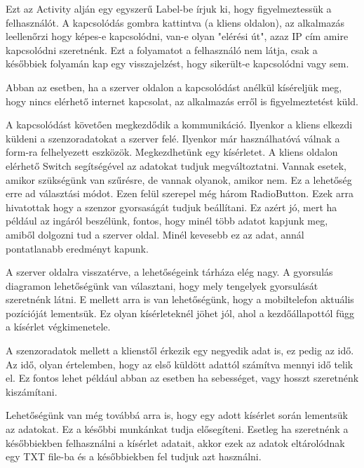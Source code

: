 \documentclass{thesis-ekf}
\theoremstyle{definition}
\theoremstyle{remark}
\begin{document}
Ezt az Activity alján egy egyszerű Label-be írjuk ki, hogy figyelmeztessük a felhasználót. A kapcsolódás gombra kattintva (a kliens oldalon), az alkalmazás leellenőrzi hogy képes-e kapcsolódni, van-e olyan "elérési út", azaz IP cím amire kapcsolódni szeretnénk. Ezt a folyamatot a felhasználó nem látja, csak a későbbiek folyamán kap egy visszajelzést, hogy sikerült-e kapcsolódni vagy sem.
\par Abban az esetben, ha a szerver oldalon a kapcsolódást anélkül kíséreljük meg, hogy nincs elérhető internet kapcsolat, az alkalmazás erről is figyelmeztetést küld.
\par A kapcsolódást követően megkezdődik a kommunikáció. Ilyenkor a kliens elkezdi küldeni a szenzoradatokat a szerver felé. Ilyenkor már használhatóvá válnak a form-ra felhelyezett eszközök. Megkezdhetünk egy kísérletet. A kliens oldalon elérhető Switch segítségével az adatokat tudjuk megváltoztatni. Vannak esetek, amikor szükségünk van szűrésre, de vannak olyanok, amikor nem. Ez a lehetőség erre ad választási módot. Ezen felül szerepel még három RadioButton. Ezek arra hivatottak hogy a szenzor gyorsaságát tudjuk beállítani. Ez azért jó, mert ha például az ingáról beszélünk, fontos, hogy minél több adatot kapjunk meg, amiből dolgozni tud a szerver oldal. Minél kevesebb ez az adat, annál pontatlanabb eredményt kapunk.
\par A szerver oldalra visszatérve, a lehetőségeink tárháza elég nagy. A gyorsulás diagramon lehetőségünk van választani, hogy mely tengelyek gyorsulását szeretnénk látni. E mellett arra is van lehetőségünk, hogy a mobiltelefon aktuális pozícióját lementsük. Ez olyan kísérleteknél jöhet jól, ahol a kezdőállapottól függ a kísérlet végkimenetele.
\par A szenzoradatok mellett a klienstől érkezik egy negyedik adat is, ez pedig az idő. Az idő, olyan értelemben, hogy az első küldött adattól számítva mennyi idő telik el. Ez fontos lehet például abban az esetben ha sebességet, vagy hosszt szeretnénk kiszámítani.
\par Lehetőségünk van még továbbá arra is, hogy egy adott kísérlet során lementsük az adatokat. Ez a későbbi munkánkat tudja elősegíteni. Esetleg ha szeretnénk a későbbiekben felhasználni a kísérlet adatait, akkor ezek az adatok eltárolódnak egy TXT file-ba és a későbbiekben fel tudjuk azt használni.
\end{document}
